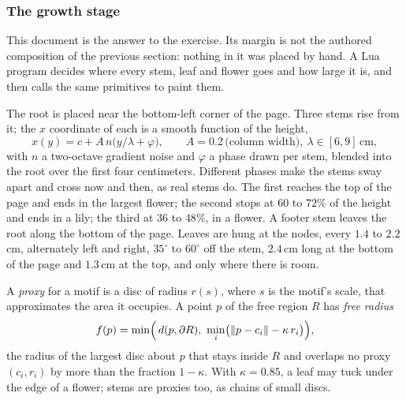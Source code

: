 
\subsubsection{The growth stage}

This document is the answer to the exercise. Its margin is not the
authored composition of
the previous section: nothing in it was placed by hand. A Lua program
decides where every
stem, leaf and flower goes and how large it is, and then calls the
same primitives to paint
them.

\begin{construction}[Stems]
  The root is placed near the bottom-left corner of the page. Three
  stems rise from it; the
  $x$ coordinate of each is a smooth function of the height,
  \[
    x(y)=c+A\,n\bigl(y/\lambda+\varphi\bigr),
    \qquad A=0.2\,\text{(column width)},\ \lambda\in[6,9]\,\text{cm},
  \]
  with $n$ a two-octave gradient noise and $\varphi$ a phase drawn
  per stem, blended into the
  root over the first four centimeters. Different phases make the
  stems sway apart and cross
  now and then, as real stems do. The first reaches the top of the
  page and ends in the
  largest flower; the second stops at $60$ to $72\%$ of the height
  and ends in a lily; the
  third at $36$ to $48\%$, in a flower. A footer stem leaves the root
  along the bottom of the
  page. Leaves are hung at the nodes, every $1.4$ to $2.2\,$cm,
  alternately left and right,
  $35^\circ$ to $60^\circ$ off the stem, $2.4\,$cm long at the bottom
  of the page and $1.3\,$cm at
  the top, and only where there is room.
\end{construction}

\begin{definition}
  A \emph{proxy} for a motif is a disc of radius $r(s)$, where $s$ is
  the motif's scale, that
  approximates the area it occupies. A point $p$ of the free region
  $R$ has \emph{free
  radius}
  \[
    f(p)=\min\Bigl(\,d(p,\partial R),\ \min_i\bigl(\lVert
    p-c_i\rVert-\kappa\,r_i\bigr)\Bigr),
  \]
  the radius of the largest disc about $p$ that stays inside $R$ and
  overlaps no proxy
  $(c_i,r_i)$ by more than the fraction $1-\kappa$. With
  $\kappa=0.85$, a leaf may tuck under
  the edge of a flower; stems are proxies too, as chains of small discs.
\end{definition}

